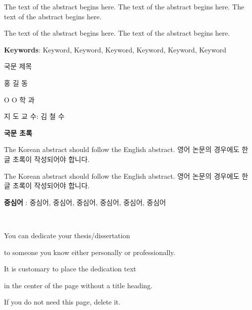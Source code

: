\documentclass{report}
\begin{document}
\normalsize
\justifying %
\doublespacing
The text of the abstract begins here. The text of the abstract begins here. The text of the abstract begins here. \par

The text of the abstract begins here. The text of the abstract begins here.
\par\vspace{20pt}
\textbf{Keywords}: Keyword, Keyword, Keyword, Keyword, Keyword, Keyword


\newpage 
\begin{center}
\LARGE 국문 제목 %
\par\vspace{20pt}
\normalsize 홍 길 동\par %
O O 학 과\par %
지 도 교 수:  김 철 수
\par\vspace{20pt}
\large \textbf{국문 초록}
\end{center}
\normalsize 
The Korean abstract should follow the English abstract.
영어 논문의 경우에도 한글 초록이 작성되어야 합니다. \par
The Korean abstract should follow the English abstract.
영어 논문의 경우에도 한글 초록이 작성되어야 합니다. 
\par \vspace{20pt}
\textbf{중심어} : 중심어, 중심어, 중심어, 중심어, 중심어, 중심어

\newpage
~
\vspace{5.5cm} \par
\begin{center}
You can dedicate your thesis/dissertation  \par 
to someone you know either personally or professionally. \par
It is customary to place the dedication text \par
in the center of the page without a title heading. \par
If you do not need this page, delete it.
\end{center}
\end{document}
